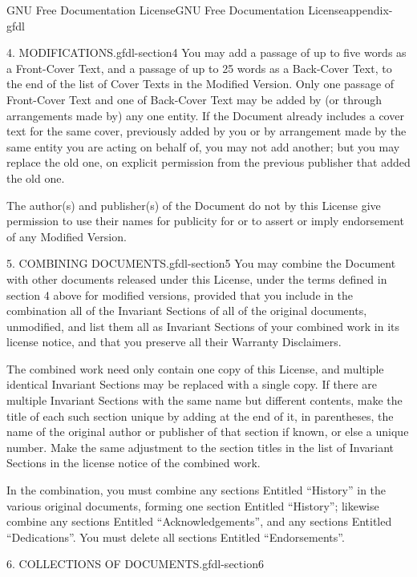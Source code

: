 \documentclass[oneside,10pt,]{book}
\numberwithin{equation}{section}
\begin{document}
\begin{appendixptx}{GNU Free Documentation License}{}{GNU Free Documentation License}{}{}{appendix-gfdl}
\begin{paragraphs}{4. MODIFICATIONS.}{gfdl-section4}
You may add a passage of up to five words as a Front-Cover Text, and a passage of up to 25 words as a Back-Cover Text, to the end of the list of Cover Texts in the Modified Version. Only one passage of Front-Cover Text and one of Back-Cover Text may be added by (or through arrangements made by) any one entity. If the Document already includes a cover text for the same cover, previously added by you or by arrangement made by the same entity you are acting on behalf of, you may not add another; but you may replace the old one, on explicit permission from the previous publisher that added the old one.%
\par
\hypertarget{p-741}{}%
The author(s) and publisher(s) of the Document do not by this License give permission to use their names for publicity for or to assert or imply endorsement of any Modified Version.%
\end{paragraphs}%
\begin{paragraphs}{5. COMBINING DOCUMENTS.}{gfdl-section5}%
\hypertarget{p-742}{}%
You may combine the Document with other documents released under this License, under the terms defined in section 4 above for modified versions, provided that you include in the combination all of the Invariant Sections of all of the original documents, unmodified, and list them all as Invariant Sections of your combined work in its license notice, and that you preserve all their Warranty Disclaimers.%
\par
\hypertarget{p-743}{}%
The combined work need only contain one copy of this License, and multiple identical Invariant Sections may be replaced with a single copy. If there are multiple Invariant Sections with the same name but different contents, make the title of each such section unique by adding at the end of it, in parentheses, the name of the original author or publisher of that section if known, or else a unique number. Make the same adjustment to the section titles in the list of Invariant Sections in the license notice of the combined work.%
\par
\hypertarget{p-744}{}%
In the combination, you must combine any sections Entitled ``History'' in the various original documents, forming one section Entitled ``History''; likewise combine any sections Entitled ``Acknowledgements'', and any sections Entitled ``Dedications''. You must delete all sections Entitled ``Endorsements''.%
\end{paragraphs}%
\begin{paragraphs}{6. COLLECTIONS OF DOCUMENTS.}{gfdl-section6}%
\hypertarget{p-745}{}%

\end{paragraphs}
\end{appendixptx}
\end{document}
